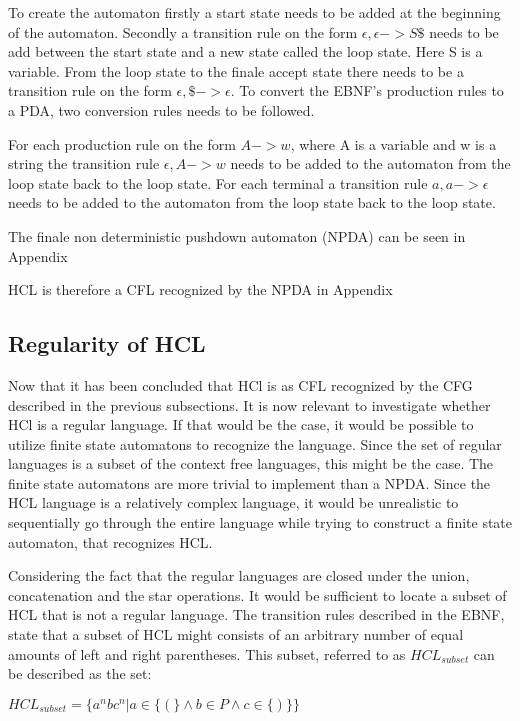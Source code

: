 To create the automaton firstly a start state needs to be added at the beginning of the automaton. 
Secondly a transition rule on the form $\epsilon,\epsilon->S\$$ needs to be add between the start state and a new state called the loop state.
Here S is a variable.
From the loop state to the finale accept state there needs to be a transition rule on the form $\epsilon,\$->\epsilon$.
To convert the EBNF's production rules to a PDA, two conversion rules needs to be followed.

For each production rule on the form $A->w$, where A is a variable and w is a string the transition rule $\epsilon,A->w$ needs to be added to the automaton from the loop state back to the loop state.
For each terminal a transition rule $a,a->\epsilon$ needs to be added to the automaton from the loop state back to the loop state.

The finale non deterministic pushdown automaton (NPDA) can be seen in Appendix %

HCL is therefore a CFL recognized by the NPDA in Appendix %

\subsection{Regularity of HCL}
Now that it has been concluded that HCl is as CFL recognized by the CFG described in the previous subsections.
It is now relevant to investigate whether HCl is a regular language. 
If that would be the case, it would be possible to utilize finite state automatons to recognize the language.
Since the set of regular languages is a subset of the context free languages, this might be the case.
The finite state automatons are more trivial to implement than a NPDA. 
Since the HCL language is a relatively complex language, it would be unrealistic to sequentially go through the entire language while trying to construct a finite state automaton, that recognizes HCL.

Considering the fact that the regular languages are closed under the union, concatenation and the star operations. 
It would be sufficient to locate a subset of HCL that is not a regular language.
The transition rules described in the EBNF, state that a subset of HCL might consists of an arbitrary number of equal amounts of left and right parentheses.
This subset, referred to as $HCL_{subset}$ can be described as the set:
\begin{center}
	$HCL_{subset} = \{a^nbc^n | a \in \{(\} \wedge b \in P \wedge c \in \{)\}\}$
\end{center}

